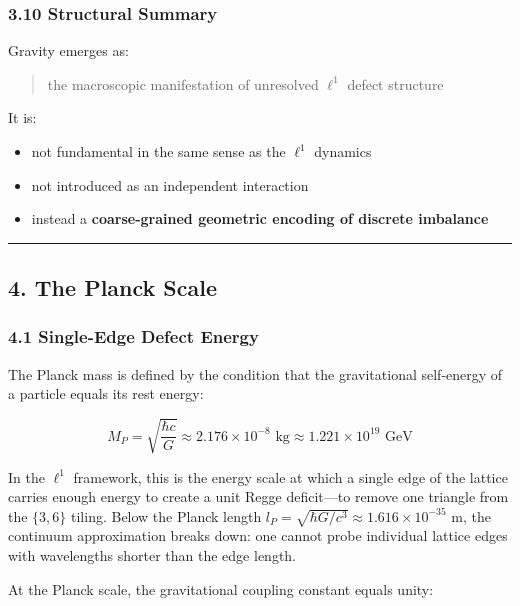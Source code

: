\documentclass[
]{article}
\providecommand{\tightlist}{%
  \setlength{\itemsep}{0pt}\setlength{\parskip}{0pt}}
\begin{document}
\subsubsection{3.10 Structural Summary}\label{structural-summary}

Gravity emerges as:

\begin{quote}
the macroscopic manifestation of unresolved \(\ell^1\) defect structure
\end{quote}

It is:

\begin{itemize}
\tightlist
\item
  not fundamental in the same sense as the \(\ell^1\) dynamics
\item
  not introduced as an independent interaction
\item
  instead a \textbf{coarse-grained geometric encoding of discrete
  imbalance}
\end{itemize}

\begin{center}\rule{0.5\linewidth}{0.5pt}\end{center}

\subsection{4. The Planck Scale}\label{the-planck-scale}

\subsubsection{4.1 Single-Edge Defect
Energy}\label{single-edge-defect-energy}

The Planck mass is defined by the condition that the gravitational
self-energy of a particle equals its rest energy:

\[M_P = \sqrt{\frac{\hbar c}{G}} \approx 2.176 \times 10^{-8} \text{ kg} \approx 1.221 \times 10^{19} \text{ GeV}\]

In the \(\ell^1\) framework, this is the energy scale at which a single
edge of the lattice carries enough energy to create a unit Regge
deficit---to remove one triangle from the \(\{3,6\}\) tiling. Below the
Planck length
\(l_P = \sqrt{\hbar G / c^3} \approx 1.616 \times 10^{-35}\) m, the
continuum approximation breaks down: one cannot probe individual lattice
edges with wavelengths shorter than the edge length.

At the Planck scale, the gravitational coupling constant equals unity:
\end{document}
